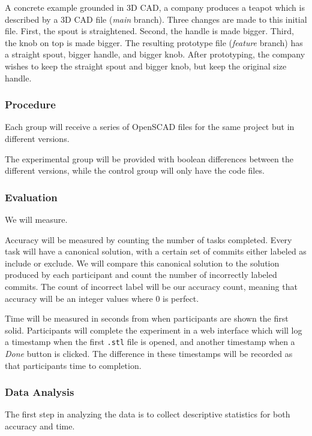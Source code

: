 \documentclass[sigconf,authorversion,nonacm]{acmart}
\begin{document}
A concrete example grounded in 3D CAD, a company produces a teapot which is described by a 3D CAD file (\emph{main} branch).
Three changes are made to this initial file.
First, the spout is straightened.
Second, the handle is made bigger.
Third, the knob on top is made bigger.
The resulting prototype file (\emph{feature} branch) has a straight spout, bigger handle, and bigger knob.
After prototyping, the company wishes to keep the straight spout and bigger knob, but keep the original size handle.

\subsubsection{Procedure}

Each group will receive a series of OpenSCAD files for the same project but in different versions.

The experimental group will be provided with boolean differences between the different versions, while the control group will only have the code files.

\subsubsection{Evaluation}

We will measure.

Accuracy will be measured by counting the number of tasks completed.
Every task will have a canonical solution, with a certain set of commits either labeled as include or exclude.
We will compare this canonical solution to the solution produced by each participant and count the number of incorrectly labeled commits.
The count of incorrect label will be our accuracy count, meaning that accuracy will be an integer values where 0 is perfect.


Time will be measured in seconds from when participants are shown the first solid.
Participants will complete the experiment in a web interface which will log a timestamp when the first \texttt{.stl} file is opened, and another timestamp when a \emph{Done} button is clicked.
The difference in these timestamps will be recorded as that participants time to completion.

\subsubsection{Data Analysis}

The first step in analyzing the data is to collect descriptive statistics for both accuracy and time.
\end{document}
